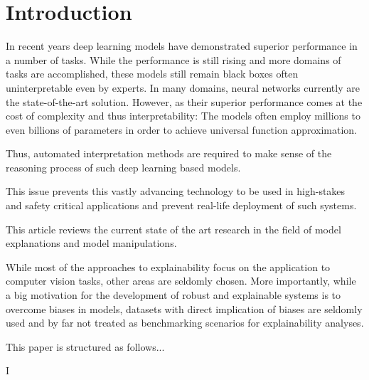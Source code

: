 \section{Introduction}
\label{sec:introduction}

In recent years deep learning models have demonstrated superior performance in a number of tasks. While the performance is still rising and more domains of tasks are accomplished, these models still remain black boxes often uninterpretable even by experts. 
In many domains, neural networks currently are the state-of-the-art solution. However, as their superior performance comes at the cost of complexity and thus interpretability: The models often employ millions to even billions of parameters in order to achieve universal function approximation.

Thus, automated interpretation methods are required to make sense of the reasoning process of such deep learning based models. 

This issue prevents this vastly advancing technology to be used in high-stakes and safety critical applications and prevent real-life deployment of such systems. 

This article reviews the current state of the art research in the field of model explanations and model manipulations. 



While most of the approaches to explainability focus on the application to computer vision tasks, other areas are seldomly chosen. 
More importantly, while a big motivation for the development of robust and explainable systems is to overcome biases in models, datasets with 
direct implication of biases are seldomly used and by far not treated as benchmarking scenarios for explainability analyses.  



This paper is structured as follows... 

I